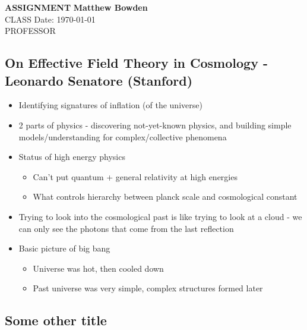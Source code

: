 \documentclass[letterpaper, 11pt]{article}
\begin{document}
\noindent
\large\textbf{ASSIGNMENT} \hfill \textbf{Matthew Bowden} \\
\normalsize CLASS \hfill Date: \today \\
PROFESSOR

\subsection*{On Effective Field Theory in Cosmology - Leonardo Senatore (Stanford)}
	\begin{itemize}
		\item Identifying signatures of inflation (of the universe)
		\item 2 parts of physics - discovering not-yet-known physics, and building simple models/understanding for complex/collective phenomena
		\item Status of high energy physics
		\begin{itemize}
			\item Can't put quantum + general relativity at high energies
			\item What controls hierarchy between planck scale and cosmological constant
		\end{itemize}
		\item Trying to look into the cosmological past is like trying to look at a cloud - we can only see the photons that come from the last reflection
		\item Basic picture of big bang
		\begin{itemize}
			\item Universe was hot, then cooled down
			\item Past universe was very simple, complex structures formed later
		\end{itemize}
	\end{itemize}
\subsection*{Some other title}
\end{document}

